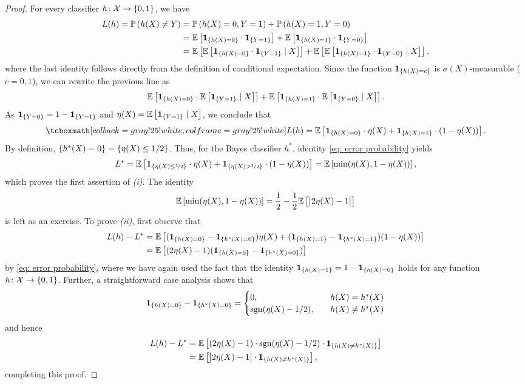 \begin{proof}
For every classifier $h \colon \mathcal{X} \to \left\{0, 1\right\}$, we have
\begin{align*}
    L(h) = \mathbb{P}\left(h(X) \neq Y\right) &= \mathbb{P}\left(h(X) = 0, Y = 1\right) + \mathbb{P}\left(h(X) = 1, Y = 0\right) \\
        &= \mathbb{E}\left[\mathbf{1}_{\left\{h(X) = 0\right\}} \cdot \mathbf{1}_{\left\{Y = 1\right\}}\right] + \mathbb{E}\left[\mathbf{1}_{\left\{h(X) = 1\right\}} \cdot \mathbf{1}_{\left\{Y = 0\right\}}\right] \\
        &= \mathbb{E}\left[\mathbb{E}\left[\mathbf{1}_{\left\{h(X) = 0\right\}} \cdot \mathbf{1}_{\left\{Y = 1\right\}} \mathrel{|} X\right]\right] + \mathbb{E}\left[\mathbb{E}\left[\mathbf{1}_{\left\{h(X) = 1\right\}} \cdot \mathbf{1}_{\left\{Y = 0\right\}} \mathrel{|} X\right]\right],
\end{align*}
where the last identity follows directly from the definition of conditional expectation. Since the function $\mathbf{1}_{\left\{h(X) = c\right\}}$ is $\sigma(X)$-measurable ($c = 0, 1$), we can rewrite the previous line as
\[
    \mathbb{E}\left[\mathbf{1}_{\left\{h(X) = 0\right\}} \cdot \mathbb{E}\left[\mathbf{1}_{\left\{Y = 1\right\}} \mathrel{|} X\right]\right] + \mathbb{E}\left[\mathbf{1}_{\left\{h(X) = 1\right\}} \cdot \mathbb{E}\left[\mathbf{1}_{\left\{Y = 0\right\}} \mathrel{|} X\right]\right].
\]
As $\mathbf{1}_{\left\{Y = 0\right\}} = 1 - \mathbf{1}_{\left\{Y = 1\right\}}$ and $\eta(X) = \mathbb{E}\left[\mathbf{1}_{\left\{Y = 1\right\}} \mathrel{|} X\right]$, we conclude that
\begin{equation}
    \label{eq: error probability}
    \highlightMath{
        L(h) = \Ex{\indSet{h(X) = 0} \cdot \eta(X) + \indSet{h(X) = 1} \cdot (1 - \eta(X))}.
    }
\end{equation}
By definition, $\left\{h^*(X) = 0\right\} = \left\{\eta(X) \leq 1/2\right\}$. Thus, for the Bayes classifier $h^*$, identity \eqref{eq: error probability} yields
\[
    L^* = \mathbb{E}\left[\mathbf{1}_{\left\{\eta(X) \leq \nicefrac{1}{2}\right\}} \cdot \eta(X) + \mathbf{1}_{\left\{\eta(X) > \nicefrac{1}{2}\right\}} \cdot (1 - \eta(X))\right] = \mathbb{E}\left[\min(\eta(X), 1 - \eta(X))\right],
\]
which proves the first assertion of \emph{(i)}. The identity
\[
    \mathbb{E}\left[\min(\eta(X), 1 - \eta(X))\right] = \frac{1}{2} - \frac{1}{2} \mathbb{E}\left[\big\lvert 2\eta(X) - 1 \big\rvert\right]
\]
is left as an exercise. To prove \emph{(ii)}, first observe that
\begin{align*}
    L(h) - L^*& = \mathbb{E}\left[(\mathbf{1}_{\left\{h(X) = 0\right\}} - \mathbf{1}_{\left\{h^*(X) = 0\right\}}) \eta(X) + (\mathbf{1}_{\left\{h(X) = 1\right\}} - \mathbf{1}_{\left\{h^*(X) = 1\right\}}) (1 - \eta(X))\right] \\
        &= \mathbb{E}\left[(2 \eta(X) - 1) (\mathbf{1}_{\left\{h(X) = 0\right\}} - \mathbf{1}_{\left\{h^*(X) = 0\right\}})\right]
\end{align*}
by \eqref{eq: error probability}, where we have again used the fact that the identity $\mathbf{1}_{\left\{h(X) = 1\right\}} = 1 - \mathbf{1}_{\left\{h(X) = 0\right\}}$ holds for any function $h \colon \mathcal{X} \to \left\{0, 1\right\}$. Further, a straightforward case analysis shows that
\[
    \mathbf{1}_{\left\{h(X) = 0\right\}} - \mathbf{1}_{\left\{h^*(X) = 0\right\}} = \begin{cases}
        0, \quad & h(X) = h^*(X) \\
        \mathrm{sgn}(\eta(X) - 1/2), \quad & h(X) \neq h^*(X)
    \end{cases}
\]
and hence
\begin{align*}
    L(h) - L^* &= \mathbb{E}\left[(2\eta(X) - 1) \cdot \mathrm{sgn}(\eta(X) - 1/2) \cdot \mathbf{1}_{\left\{h(X) \neq h^*(X)\right\}}\right] \\
        &= \mathbb{E}\left[\big\lvert 2\eta(X) - 1 \big\rvert \cdot \mathbf{1}_{\left\{h(X) \neq h^*(X)\right\}}\right],
\end{align*}
completing this proof.
\end{proof}

